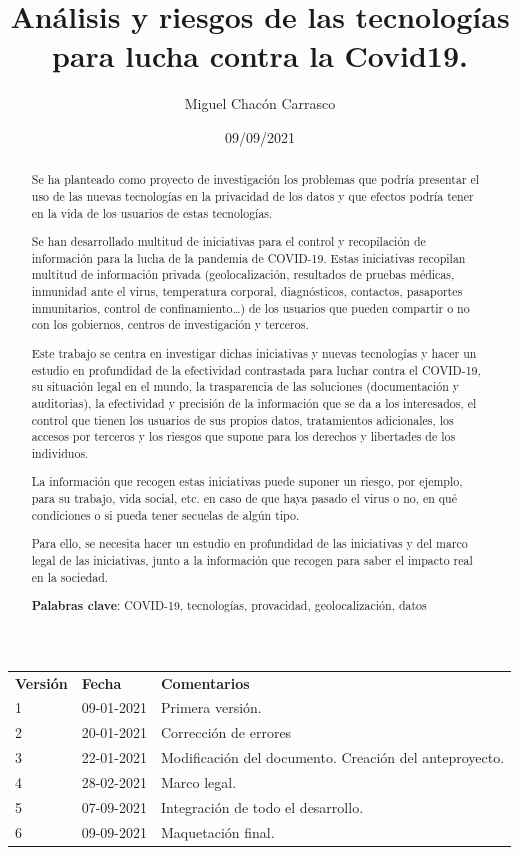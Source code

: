 \documentclass[11pt,a4paper,spanish]{article}
\title{Análisis y riesgos de las tecnologías para lucha contra la Covid19.}
\date{09/09/2021}
\author{Miguel Chacón Carrasco}
\begin{document}
	\maketitle
\begin{tabular}{p{2cm} p{3cm} p{6cm} }
\textbf{Versión} & \textbf{Fecha} & \textbf{Comentarios}  \\
1              & 09-01-2021     & Primera versión.      \\
2              & 20-01-2021     & Corrección de errores      \\
3              & 22-01-2021     & Modificación del documento. Creación del anteproyecto.     \\
4              & 28-02-2021     & Marco legal.     \\
5              & 07-09-2021     & Integración de todo el desarrollo.     \\
6              & 09-09-2021     & Maquetación final. 
\end{tabular}
\begin{abstract}
Se ha planteado como proyecto de investigación los problemas que podría presentar el uso de las nuevas tecnologías en la privacidad de los datos y que efectos podría tener en la vida de los usuarios de estas tecnologías.

Se han desarrollado multitud de iniciativas para el control y recopilación de información para la lucha de la pandemia de COVID-19. Estas iniciativas recopilan multitud de información privada (geolocalización, resultados de pruebas médicas, inmunidad ante el virus, temperatura corporal, diagnósticos, contactos, pasaportes inmunitarios, control de confinamiento…) de los usuarios que pueden compartir o no con los gobiernos, centros de investigación y terceros.

Este trabajo se centra en investigar dichas iniciativas y nuevas tecnologías y hacer un estudio en profundidad de la efectividad contrastada para luchar contra el COVID-19, su situación legal en el mundo, la trasparencia de las soluciones (documentación y auditorias), la efectividad y precisión de la información que se da a los interesados, el control que tienen los usuarios de sus propios datos, tratamientos adicionales, los accesos por terceros y los riesgos que supone para los derechos y libertades de los individuos.
 
La información que recogen estas iniciativas puede suponer un riesgo, por ejemplo, para su trabajo, vida social, etc. en caso de que haya pasado el virus o no, en qué condiciones o si pueda tener secuelas de algún tipo. 

Para ello, se necesita hacer un estudio en profundidad de las iniciativas y del marco legal de las iniciativas, junto a la información que recogen para saber el impacto real en la sociedad.

\textbf{Palabras clave}: COVID-19, tecnologías, provacidad, geolocalización, datos

\end{abstract}
\end{document}
